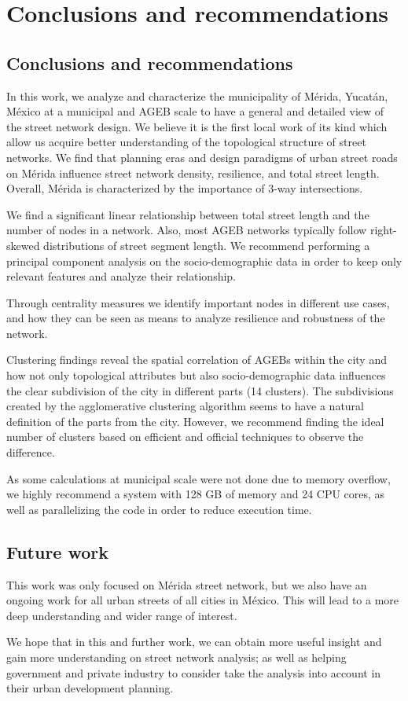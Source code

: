 \chapter{Conclusions and recommendations}
\label{cha:conclusions}
\section{Conclusions and recommendations}

In this work, we analyze and characterize the municipality of Mérida, Yucatán, México at a municipal and AGEB scale to have a general and detailed view of the street network design. We believe it is the first local work of its kind which allow us acquire better understanding of the topological structure of street networks. We find that planning eras and design paradigms of urban street roads on Mérida influence street network density, resilience, and total street length. Overall, Mérida is characterized by the importance of 3-way intersections. 

We find a significant linear relationship between total street length and the number of nodes in a network. Also, most AGEB networks typically follow right-skewed distributions of street segment length. We recommend performing a principal component analysis on the socio-demographic data in order to keep only relevant features and analyze their relationship.

Through centrality measures we identify important nodes in different use cases, and how they can be seen as means to analyze resilience and robustness of the network.

Clustering findings reveal the spatial correlation of AGEBs within the city and how not only topological attributes but also socio-demographic data influences the clear subdivision of the city in different parts (14 clusters). The subdivisions created by the agglomerative clustering algorithm seems to have a natural definition of the parts from the city. However, we recommend finding the ideal number of clusters based on efficient and official techniques to observe the difference.

As some calculations at municipal scale were not done due to memory overflow, we highly recommend a system with 128 GB of memory and 24 CPU cores, as well as parallelizing the code in order to reduce execution time.


\section{Future work}

This work was only focused on Mérida street network, but we also have an ongoing work for all urban streets of all cities in México. This will lead to a more deep understanding and wider range of interest.

We hope that in this and further work, we can obtain more useful insight and gain more understanding on street network analysis; as well as helping government and private industry to consider take the analysis into account in their urban development planning.
